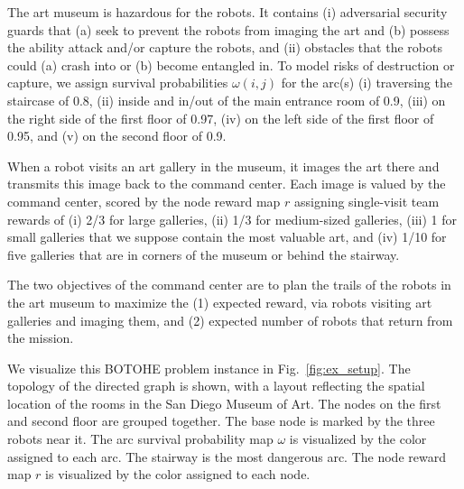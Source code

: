 \documentclass[11pt, oneside]{article}
\begin{document}
The art museum is hazardous for the robots. It contains
(i) adversarial security guards that (a) seek to prevent the robots from imaging the art and (b) possess the ability attack and/or capture the robots, and
(ii) obstacles that the robots could (a) crash into or (b) become entangled in.
To model risks of destruction or capture, we assign survival probabilities $\omega(i,j)$ for the arc(s)
(i) traversing the staircase of 0.8,
(ii) inside and in/out of the main entrance room of 0.9,
(iii) on the right side of the first floor of 0.97,
(iv) on the left side of the first floor of 0.95,
and
(v) on the second floor of 0.9.

When a robot visits an art gallery in the museum, it images the art there and transmits this image back to the command center. 
Each image is valued by the command center, scored by
the node reward map $r$ assigning single-visit team rewards of
(i) 2/3 for large galleries,
(ii) 1/3 for medium-sized galleries,
(iii) 1 for small galleries that we suppose contain the most valuable art, and
(iv) 1/10 for five galleries that are in corners of the museum or behind the stairway.

The two objectives of the command center are to plan the trails of the robots in the art museum to maximize the (1) expected reward, via robots visiting art galleries and imaging them, and (2) expected number of robots that return from the mission. 

We visualize this BOTOHE problem instance in Fig.~\ref{fig:ex_setup}. 
The topology of the directed graph is shown, with a layout reflecting the spatial location of the rooms in the San Diego Museum of Art. The nodes on the first and second floor are grouped together.
The base node is marked by the three robots near it.
The arc survival probability map $\omega$ is visualized by the color assigned to each arc.
The stairway is the most dangerous arc.
The node reward map $r$ is visualized by the color assigned to each node. 

\end{document}
